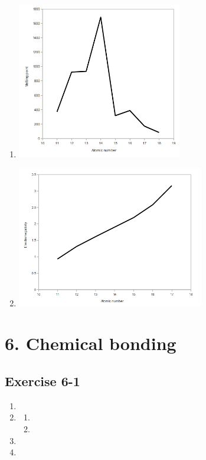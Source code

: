 \begin{multicols}{3}
\begin{enumerate}[itemsep=6pt, label=\textbf{\arabic*}. ]
\begin{enumerate}[noitemsep, label=\textbf{(\alph*)} ]
    \item \includegraphics[width=.2\textwidth]{photos/periodictable_eocex_graph3.png}
    \item \includegraphics[width=.2\textwidth]{photos/periodic_table_eocex_graph4.png}
    \end{enumerate}
\end{enumerate}
\end{multicols}

\section {6. Chemical bonding}
\subsection{Exercise 6-1} 
    \begin{enumerate}[noitemsep, label=\textbf{\arabic*}.]
	\item %

	\item %
	\begin{enumerate}[noitemsep, label=\textbf{(\alph*)} ]
	    \item %

	    \item %
	\end{enumerate}

	\item %

	\item %
    \end{enumerate}

